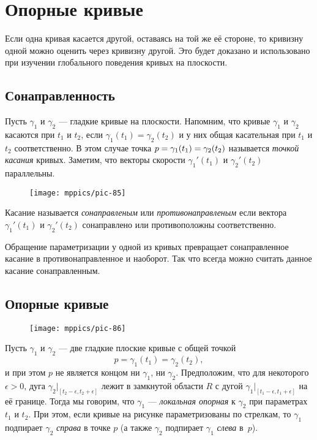 \chapter{Опорные кривые}
\label{chap:supporting-curves}


Если одна кривая касается другой, оставаясь на той же её стороне, то кривизну одной можно оценить через кривизну другой.
Это будет доказано и использовано при изучении глобального поведения кривых на плоскости.

\section{Сонаправленность}

Пусть $\gamma_1$ и $\gamma_2$ --- гладкие кривые на плоскости.
Напомним, что кривые $\gamma_1$ и $\gamma_2$ касаются при $t_1$ и $t_2$,
если $\gamma_1(t_1)=\gamma_2(t_2)$
и у них общая касательная при $t_1$ и $t_2$ соответственно.
В этом случае точка $p\z=\gamma_1(t_1)=\gamma_2(t_2)$ называется \emph{точкой касания} кривых.
Заметим, что векторы скорости $\gamma_1'(t_1)$ и $\gamma_2'(t_2)$ параллельны.
\begin{figure}[!ht]
\vskip-0mm
\centering
\texttt{[image: mppics/pic-85]}
\vskip-0mm
\end{figure}
Касание называется \emph{сонаправленым} или {}\emph{противонаправленым} если вектора $\gamma_1'(t_1)$ и $\gamma_2'(t_2)$ сонаправлено или противоположны соответственно.

Обращение параметризации у одной из кривых превращает сонаправленное касание в противонаправленное и наоборот.
Так что всегда можно считать данное касание сонаправленным.

\pagebreak%

\section{Опорные кривые}

\begin{wrapfigure}[8]{o}{43 mm}
\vskip-4mm
\centering
\texttt{[image: mppics/pic-86]}
\vskip0mm
\end{wrapfigure}

Пусть $\gamma_1$ и $\gamma_2$ --- две гладкие плоские кривые с общей точкой 
\[p=\gamma_1(t_1)=\gamma_2(t_2),\] 
и при этом $p$ не является концом ни $\gamma_1$, ни $\gamma_2$.
Предположим, что для некоторого $\epsilon>0$, дуга $\gamma_2|_{[t_2-\epsilon, t_2+\epsilon]}$ лежит в замкнутой области $R$ с дугой $\gamma_1|_{[t_1-\epsilon, t_1+\epsilon]}$ на её границе.
Тогда мы говорим, что $\gamma_1$ --- \emph{локальная опорная} к $\gamma_2$ при параметрах $t_1$ и $t_2$.
При этом, если кривые на рисунке параметризованы по стрелкам, то $\gamma_1$ подпирает $\gamma_2$ \emph{справа} в точке $p$ (а также $\gamma_2$ подпирает $\gamma_1$ \emph{слева} в~$p$).

